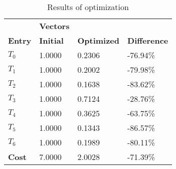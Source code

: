 \begin{table}[h!]
\centering
\begin{tabular}{llll}
\textbf{}      & \cellcolor[HTML]{EFEFEF}\textbf{Vectors} & \textbf{} & \textbf{}         \\
\rowcolor[HTML]{EFEFEF} 
\textbf{Entry} & \textbf{Initial} & \textbf{Optimized} & \textbf{Difference} \\
$T_0$ & 1.0000 & 0.2306 & -76.94\% \\ 
$T_1$ & 1.0000 & 0.2002 & -79.98\% \\ 
$T_2$ & 1.0000 & 0.1638 & -83.62\% \\ 
$T_3$ & 1.0000 & 0.7124 & -28.76\% \\ 
$T_4$ & 1.0000 & 0.3625 & -63.75\% \\ 
$T_5$ & 1.0000 & 0.1343 & -86.57\% \\ 
$T_6$ & 1.0000 & 0.1989 & -80.11\% \\ 
\rowcolor[HTML]{EFEFEF} 
\textbf{Cost}  & 7.0000 & 2.0028 & -71.39\% \\ 
\end{tabular}
\caption{Results of optimization}
\label{tab:OptimizationAnalysis}
\end{table}